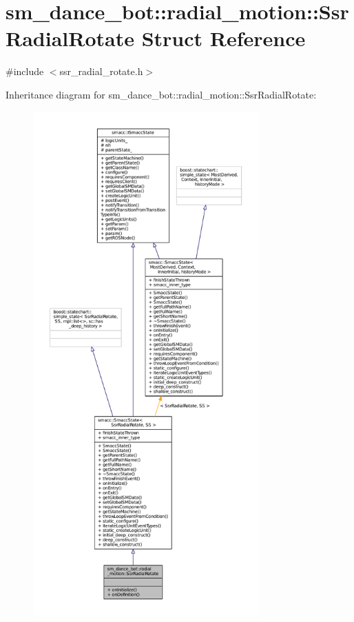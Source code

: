 \hypertarget{structsm__dance__bot_1_1radial__motion_1_1SsrRadialRotate}{}\section{sm\+\_\+dance\+\_\+bot\+:\+:radial\+\_\+motion\+:\+:Ssr\+Radial\+Rotate Struct Reference}
\label{structsm__dance__bot_1_1radial__motion_1_1SsrRadialRotate}


{\ttfamily \#include $<$ssr\+\_\+radial\+\_\+rotate.\+h$>$}



Inheritance diagram for sm\+\_\+dance\+\_\+bot\+:\+:radial\+\_\+motion\+:\+:Ssr\+Radial\+Rotate\+:
\nopagebreak
\begin{figure}[H]
\begin{center}
\leavevmode
\includegraphics[height=550pt]{structsm__dance__bot_1_1radial__motion_1_1SsrRadialRotate__inherit__graph}
\end{center}
\end{figure}



